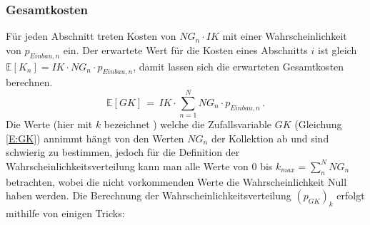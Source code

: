 \subsubsection*{Gesamtkosten}
Für jeden Abschnitt treten Kosten von $NG_n\cdot IK$ mit einer Wahrscheinlichkeit von  $p_{Einbau,n}$ ein.  Der erwartete Wert für die Kosten eines Abschnitts $i$  ist gleich $\mathbb{E}[ K_n]=IK \cdot NG_n \cdot  p_{Einbau,n}$, damit lassen sich die erwarteten Gesamtkosten berechnen.
\begin{equation*}
	\mathbb{E}[GK]\,=\, IK \cdot\sum_{n=1}^{N} NG_n \cdot p_{Einbau,n}\,.
\end{equation*}
Die Werte (hier mit $k$ bezeichnet ) welche die Zufallsvariable $GK$ (Gleichung \ref{E:GK}) annimmt hängt von den Werten $NG_n$ der Kollektion ab und sind schwierig zu bestimmen, jedoch für die Definition der Wahrscheinlichkeitsverteilung kann man alle Werte von $0$ bis $k_{max} =\sum_n^N NG_n$ betrachten, wobei die nicht vorkommenden Werte die Wahrscheinlichkeit Null haben werden. Die Berechnung der  Wahrscheinlichkeitsverteilung $\left(p_{GK}\right)_k$  erfolgt mithilfe von einigen Tricks:
